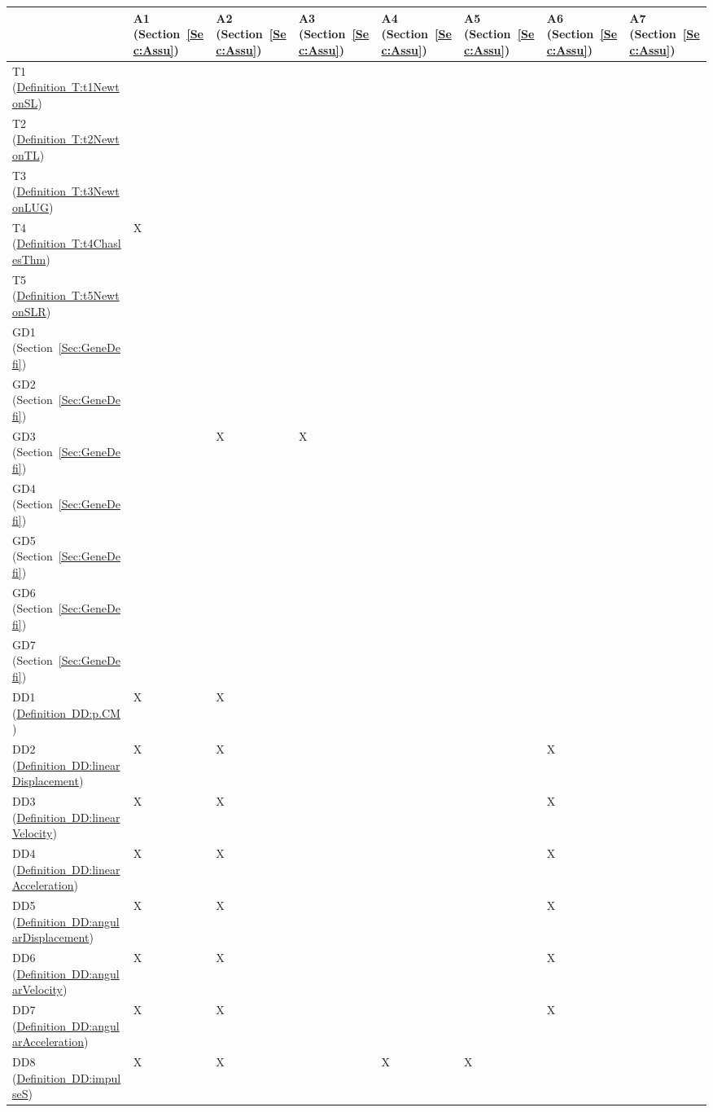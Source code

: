\documentclass[12pt]{article}
\begin{document}
\begin{longtable}{l l l l l l l l}
\toprule
 & A1 (Section~\ref{Sec:Assu}) & A2 (Section~\ref{Sec:Assu}) & A3 (Section~\ref{Sec:Assu}) & A4 (Section~\ref{Sec:Assu}) & A5 (Section~\ref{Sec:Assu}) & A6 (Section~\ref{Sec:Assu}) & A7 (Section~\ref{Sec:Assu})
\\
\midrule
T1 (\hyperref[T:t1NewtonSL]{Definition~T:t1NewtonSL}) &  &  &  &  &  &  & 
\\
T2 (\hyperref[T:t2NewtonTL]{Definition~T:t2NewtonTL}) &  &  &  &  &  &  & 
\\
T3 (\hyperref[T:t3NewtonLUG]{Definition~T:t3NewtonLUG}) &  &  &  &  &  &  & 
\\
T4 (\hyperref[T:t4ChaslesThm]{Definition~T:t4ChaslesThm}) & X &  &  &  &  &  & 
\\
T5 (\hyperref[T:t5NewtonSLR]{Definition~T:t5NewtonSLR}) &  &  &  &  &  &  & 
\\
GD1 (Section~\ref{Sec:GeneDefi}) &  &  &  &  &  &  & 
\\
GD2 (Section~\ref{Sec:GeneDefi}) &  &  &  &  &  &  & 
\\
GD3 (Section~\ref{Sec:GeneDefi}) &  & X & X &  &  &  & 
\\
GD4 (Section~\ref{Sec:GeneDefi}) &  &  &  &  &  &  & 
\\
GD5 (Section~\ref{Sec:GeneDefi}) &  &  &  &  &  &  & 
\\
GD6 (Section~\ref{Sec:GeneDefi}) &  &  &  &  &  &  & 
\\
GD7 (Section~\ref{Sec:GeneDefi}) &  &  &  &  &  &  & 
\\
DD1 (\hyperref[DD:p.CM]{Definition~DD:p.CM}) & X & X &  &  &  &  & 
\\
DD2 (\hyperref[DD:linearDisplacement]{Definition~DD:linearDisplacement}) & X & X &  &  &  & X & 
\\
DD3 (\hyperref[DD:linearVelocity]{Definition~DD:linearVelocity}) & X & X &  &  &  & X & 
\\
DD4 (\hyperref[DD:linearAcceleration]{Definition~DD:linearAcceleration}) & X & X &  &  &  & X & 
\\
DD5 (\hyperref[DD:angularDisplacement]{Definition~DD:angularDisplacement}) & X & X &  &  &  & X & 
\\
DD6 (\hyperref[DD:angularVelocity]{Definition~DD:angularVelocity}) & X & X &  &  &  & X & 
\\
DD7 (\hyperref[DD:angularAcceleration]{Definition~DD:angularAcceleration}) & X & X &  &  &  & X & 
\\
DD8 (\hyperref[DD:impulseS]{Definition~DD:impulseS}) & X & X &  & X & X &  & 

\end{longtable}
\end{document}
